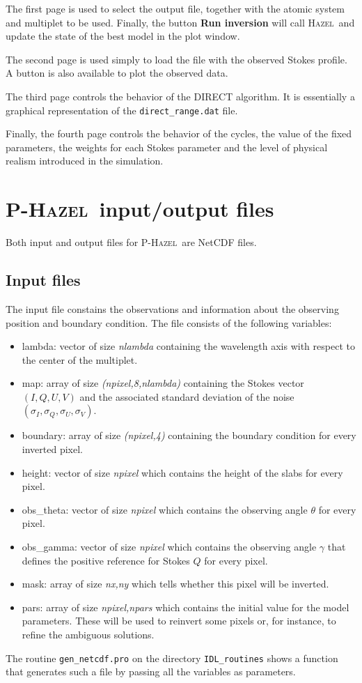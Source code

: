 \documentclass[12pt]{article}
\def\H{\textsc{Hazel}}
\def\HM{\textsc{P-Hazel}}
\begin{document}
The first page is used to select the output file, together with the 
atomic system and multiplet to be used. Finally, the button \textbf{Run inversion} will call
\H\ and update the state of the best model in the plot window.

The second page is used simply to load the file with the observed Stokes profile. A button
is also available to plot the observed data.

The third page controls the behavior of the DIRECT algorithm. It is essentially a graphical
representation of the \texttt{direct\_range.dat} file.

Finally, the fourth page controls the behavior of the cycles, the value of the fixed parameters,
the weights for each Stokes parameter and the level of physical realism introduced in the
simulation.

\section{\HM\ input/output files}
\label{sec:phazel_files}
Both input and output files for \HM\ are NetCDF files. 

\subsection{Input files}
The input file constains the
observations and information about the observing position and boundary condition. The file
consists of the following variables:
\begin{itemize}
\item lambda: vector of size \textit{nlambda} containing the wavelength axis with respect to the center of the multiplet.
\item map: array of size \textit{(npixel,8,nlambda)} containing the Stokes vector $(I,Q,U,V)$ and
the associated standard deviation of the noise $(\sigma_I,\sigma_Q,\sigma_U,\sigma_V)$.
\item boundary: array of size \textit{(npixel,4)} containing the boundary condition for every inverted pixel.
\item height: vector of size \textit{npixel} which contains the height of the slabs for every pixel.
\item obs\_theta: vector of size \textit{npixel} which contains the observing angle $\theta$ for every pixel.
\item obs\_gamma: vector of size \textit{npixel} which contains the observing angle $\gamma$ that defines the positive
reference for Stokes $Q$ for every pixel.
\item mask: array of size \textit{nx,ny} which tells whether this pixel will be inverted.
\item pars: array of size \textit{npixel,npars} which contains the initial value for the model parameters. These will be
used to reinvert some pixels or, for instance, to refine the ambiguous solutions.
\end{itemize}
The routine \texttt{gen\_netcdf.pro} on the directory \texttt{IDL\_routines} shows a function that
generates such a file by passing all the variables as parameters.
\end{document}
